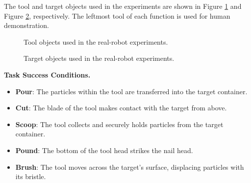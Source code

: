 \noindent The tool and target objects used in the experiments are shown in Figure \ref{fig:exp_tool} and Figure \ref{fig:exp_target}, respectively. The leftmost tool of each function is used for human demonstration.

\begin{figure}[h]
  \centering
    \vspace*{-0.1in}
  \caption{Tool objects used in the real-robot experiments.}
  \label{fig:exp_tool}
\end{figure}

\begin{figure}[h]
  \centering
    \vspace*{-0.1in}
  \caption{Target objects used in the real-robot experiments.}
  \label{fig:exp_target}
\end{figure}

\newpage


\noindent \textbf{Task Success Conditions.} 

\begin{itemize}
    \item \textbf{Pour}: The particles within the tool are transferred into the target container.
    \item \textbf{Cut}: The blade of the tool makes contact with the target from above.
    \item \textbf{Scoop}: The tool collects and securely holds particles from the target container.
    \item \textbf{Pound}: The bottom of the tool head strikes the nail head.
    \item \textbf{Brush}: The tool moves across the target’s surface, displacing particles with its bristle. \\
\end{itemize}


